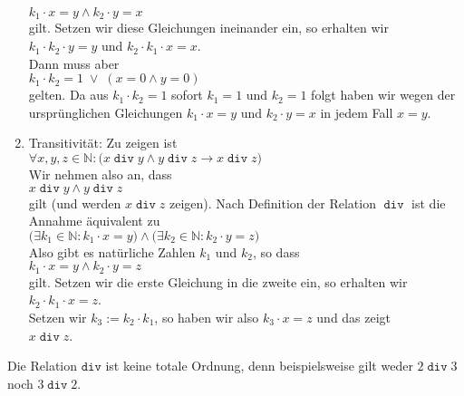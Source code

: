 \begin{enumerate}
      $k_1 \cdot x = y \wedge k_2 \cdot y = x$
      \\[0.2cm]
      gilt.  Setzen wir diese Gleichungen ineinander ein, so erhalten wir 
      \\[0.2cm]
      \hspace*{1.3cm}
      $k_1 \cdot k_2 \cdot y = y$ \quad und \quad
      $k_2 \cdot k_1 \cdot x = x$.
      \\[0.2cm] 
      Dann muss aber 
      \\[0.2cm]
      \hspace*{1.3cm}
      $k_1 \cdot k_2 = 1 \;\vee\; (x = 0 \wedge y = 0)$
      \\[0.2cm]
      gelten.  Da aus $k_1 \cdot k_2 = 1$ sofort $k_1 = 1$ und $k_2 = 1$ folgt
      haben wir wegen der urspr\"{u}nglichen Gleichungen $k_1 \cdot x = y$ und $k_2 \cdot y = x$
      in jedem Fall $x = y$.
\item Transitivit\"{a}t: Zu zeigen ist 
      \\[0.2cm]
      \hspace*{1.3cm}
      $\forall x, y, z \in \mathbb{N}:\bigl( x \mathop{\mathtt{div}} y \wedge y \mathop{\mathtt{div}} z \rightarrow x \mathop{\mathtt{div}} z\bigr)$
      \\[0.2cm] 
      Wir nehmen also an, dass 
      \\[0.2cm]
      \hspace*{1.3cm}
      $x \mathop{\mathtt{div}} y \wedge y \mathop{\mathtt{div}} z$
      \\[0.2cm]
      gilt (und werden $x \mathop{\mathtt{div}} z$ zeigen).  Nach Definition der Relation $\mathop{\mathtt{div}}$
      ist die Annahme \"{a}quivalent zu 
      \\[0.2cm]
      \hspace*{1.3cm}
      $\bigl(\exists k_1 \in \mathbb{N}: k_1 \cdot x = y \bigr) \wedge
       \bigl(\exists k_2 \in \mathbb{N}: k_2 \cdot y = z \bigr)$ 
      \\[0.2cm]
      Also gibt es nat\"{u}rliche Zahlen $k_1$ und $k_2$, so dass 
      \\[0.2cm]
      \hspace*{1.3cm}
      $k_1 \cdot x = y \wedge k_2 \cdot y = z$
      \\[0.2cm]
      gilt.  Setzen wir die erste Gleichung in die zweite  ein, so erhalten wir 
      \\[0.2cm]
      \hspace*{1.3cm}
      $k_2 \cdot k_1 \cdot x = z$.
      \\[0.2cm] 
      Setzen wir $k_3 := k_2 \cdot k_1$, so haben wir also $k_3 \cdot x = z$
      und das zeigt 
      \\[0.2cm]
      \hspace*{1.3cm}
      $x \mathop{\mathtt{div}} z$.
\end{enumerate}
Die Relation $\mathtt{div}$ ist keine totale Ordnung, denn beispielsweise gilt weder
$2 \mathop{\mathtt{div}} 3$ noch $3 \mathop{\mathtt{div}} 2$.  \exend

